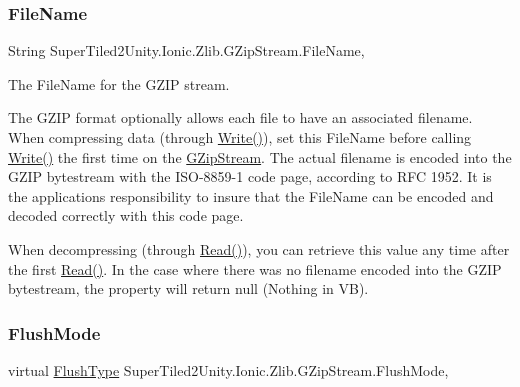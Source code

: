 \subsubsection{\texorpdfstring{File\+Name}{FileName}}
{\footnotesize\ttfamily String Super\+Tiled2\+Unity.\+Ionic.\+Zlib.\+G\+Zip\+Stream.\+File\+Name\hspace{0.3cm}{\ttfamily [get]}, {\ttfamily [set]}}



The File\+Name for the G\+Z\+IP stream. 

The G\+Z\+IP format optionally allows each file to have an associated filename. When compressing data (through {\ttfamily \mbox{\hyperlink{class_super_tiled2_unity_1_1_ionic_1_1_zlib_1_1_g_zip_stream_a49032afb5806563236a5d53841abe2b8}{Write()}}}), set this File\+Name before calling {\ttfamily \mbox{\hyperlink{class_super_tiled2_unity_1_1_ionic_1_1_zlib_1_1_g_zip_stream_a49032afb5806563236a5d53841abe2b8}{Write()}}} the first time on the {\ttfamily \mbox{\hyperlink{class_super_tiled2_unity_1_1_ionic_1_1_zlib_1_1_g_zip_stream}{G\+Zip\+Stream}}}. The actual filename is encoded into the G\+Z\+IP bytestream with the I\+S\+O-\/8859-\/1 code page, according to R\+FC 1952. It is the application\textquotesingle{}s responsibility to insure that the File\+Name can be encoded and decoded correctly with this code page. 

When decompressing (through {\ttfamily \mbox{\hyperlink{class_super_tiled2_unity_1_1_ionic_1_1_zlib_1_1_g_zip_stream_a772b5013a585850ffaf8be4aa7f3dbcf}{Read()}}}), you can retrieve this value any time after the first {\ttfamily \mbox{\hyperlink{class_super_tiled2_unity_1_1_ionic_1_1_zlib_1_1_g_zip_stream_a772b5013a585850ffaf8be4aa7f3dbcf}{Read()}}}. In the case where there was no filename encoded into the G\+Z\+IP bytestream, the property will return {\ttfamily null} ({\ttfamily Nothing} in VB). \mbox{\label{class_super_tiled2_unity_1_1_ionic_1_1_zlib_1_1_g_zip_stream_aa04b0e1934fafb1582f6d4bc8ce54542}} 
\subsubsection{\texorpdfstring{Flush\+Mode}{FlushMode}}
{\footnotesize\ttfamily virtual \mbox{\hyperlink{namespace_super_tiled2_unity_1_1_ionic_1_1_zlib_a2c5853fd63f03c83ac2458da1f4ff3bc}{Flush\+Type}} Super\+Tiled2\+Unity.\+Ionic.\+Zlib.\+G\+Zip\+Stream.\+Flush\+Mode\hspace{0.3cm}{\ttfamily [get]}, {\ttfamily [set]}}



